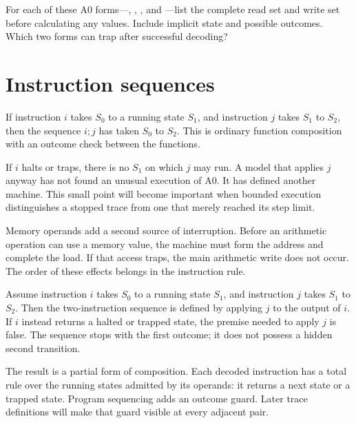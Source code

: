 \begin{tryit}[title={Read sets before arithmetic}]
For each of these A0 forms—, ,
, and —list the complete read set and
write set before calculating any values. Include implicit state and possible
outcomes. Which two forms can trap after successful decoding?
\end{tryit}

\section{Instruction sequences}

If instruction \(i\) takes \(S_0\) to a running state \(S_1\), and instruction
\(j\) takes \(S_1\) to \(S_2\), then the sequence \(i;j\) has taken \(S_0\) to
\(S_2\). This is ordinary function composition with an outcome check between
the functions.

If \(i\) halts or traps, there is no \(S_1\) on which \(j\) may run. A model
that applies \(j\) anyway has not found an unusual execution of A0. It has
defined another machine. This small point will become important when bounded
execution distinguishes a stopped trace from one that merely reached its
step limit.

Memory operands add a second source of interruption. Before an arithmetic
operation can use a memory value, the machine must form the address and
complete the load. If that access traps, the main arithmetic write does not
occur. The order of these effects belongs in the instruction rule.

\begin{proofkit}[title={\iconProofKit\ Composition needs a running middle state}]
Assume instruction \(i\) takes \(S_0\) to a running state \(S_1\), and
instruction \(j\) takes \(S_1\) to \(S_2\). Then the two-instruction sequence
is defined by applying \(j\) to the output of \(i\). If \(i\) instead returns
a halted or trapped state, the premise needed to apply \(j\) is false. The
sequence stops with the first outcome; it does not possess a hidden second
transition.
\end{proofkit}

The result is a partial form of composition. Each decoded instruction has a total
rule over the running states admitted by its operands: it returns a next state
or a trapped state. Program sequencing adds an outcome guard. Later trace
definitions will make that guard visible at every adjacent pair.

